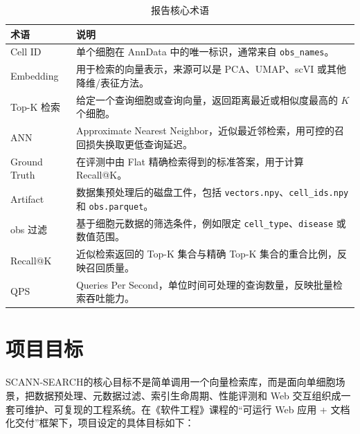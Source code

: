 \documentclass[UTF8,a4paper,12pt]{ctexrep}
\newcommand{\project}{SCANN-SEARCH}
\begin{document}
\begin{table}[H]
  \centering
  \caption{报告核心术语}
  \begin{tabularx}{0.95\textwidth}{lY}
    \toprule
    术语 & 说明 \\
    \midrule
    Cell ID & 单个细胞在 AnnData 中的唯一标识，通常来自 \texttt{obs\_names}。 \\
    Embedding & 用于检索的向量表示，来源可以是 PCA、UMAP、scVI 或其他降维/表征方法。 \\
    Top-K 检索 & 给定一个查询细胞或查询向量，返回距离最近或相似度最高的 $K$ 个细胞。 \\
    ANN & Approximate Nearest Neighbor，近似最近邻检索，用可控的召回损失换取更低查询延迟。 \\
    Ground Truth & 在评测中由 Flat 精确检索得到的标准答案，用于计算 Recall@K。 \\
    Artifact & 数据集预处理后的磁盘工件，包括 \texttt{vectors.npy}、\texttt{cell\_ids.npy} 和 \texttt{obs.parquet}。 \\
    obs 过滤 & 基于细胞元数据的筛选条件，例如限定 \texttt{cell\_type}、\texttt{disease} 或数值范围。 \\
    Recall@K & 近似检索返回的 Top-K 集合与精确 Top-K 集合的重合比例，反映召回质量。 \\
    QPS & Queries Per Second，单位时间可处理的查询数量，反映批量检索吞吐能力。 \\
    \bottomrule
  \end{tabularx}
\end{table}

\section{项目目标}

\project 的核心目标不是简单调用一个向量检索库，而是面向单细胞场景，把数据预处理、元数据过滤、索引生命周期、性能评测和 Web 交互组织成一套可维护、可复现的工程系统。在《软件工程》课程的``可运行 Web 应用 + 文档化交付''框架下，项目设定的具体目标如下：
\end{document}
